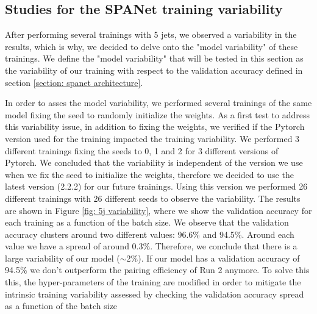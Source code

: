 
\clearpage

\subsection{Studies for the SPANet training variability} \label{subsection: pairing variability}

After performing several trainings with 5 jets, we observed a variability in the results, which is why, we decided to delve onto the "model variability" of these trainings. We define the "model variability" that will be tested in this section as the variability of our training with respect to the validation accuracy defined in section \ref{section: spanet architecture}.

In order to asses the model variability, we performed several trainings of the same model fixing the seed to randomly initialize the weights. As a first test to address this variability issue, in addition to fixing the weights, we verified if the Pytorch version used for the training impacted the training variability. We performed 3 different trainings fixing the seeds to 0, 1 and 2 for 3 different versions of Pytorch. We concluded that the variability is independent of the version we use when we fix the seed to initialize the weights, therefore we decided to use the latest version (2.2.2) for our future trainings. Using this version we performed 26 different trainings with 26 different seeds to observe the variability. The results are shown in Figure \ref{fig: 5j variability}, where we show the validation accuracy for each training as a function of the batch size. We observe that the validation accuracy clusters around two different values: 96.6\% and 94.5\%. Around each value we have a spread of around 0.3\%. Therefore, we conclude that there is a large variability of our model ($\sim$2\%). If our model has a validation accuracy of 94.5\% we don't outperform the pairing efficiency of Run 2 anymore. To solve this this, the hyper-parameters of the training are modified in order to mitigate the intrinsic training variability assessed by checking the validation accuracy spread as a function of the batch size

